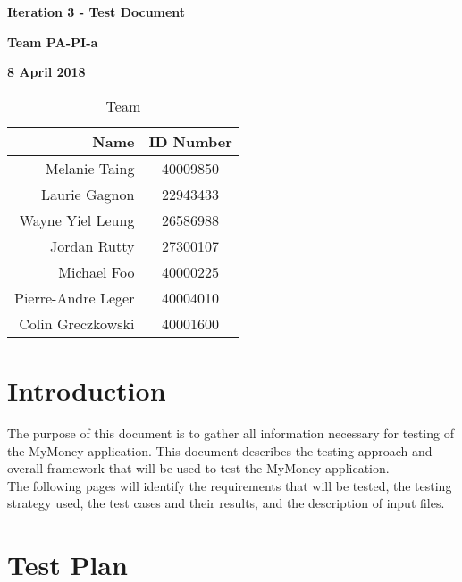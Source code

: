\documentclass[12pt]{article}
\begin{document}
\vspace*{0.5in}
\centerline{\bf\Large Iteration 3 - Test Document}

\vspace*{0.5in}
\centerline{\bf\Large Team PA-PI-a}

\vspace*{0.5in}
\centerline{\bf\Large 8 April 2018}

\vspace*{1.5in}
\begin{table}[htbp]
\caption{Team}
\begin{center}
\begin{tabular}{|r | c|}
\hline
Name & ID Number \\
\hline\hline
Melanie Taing & 40009850 \\
Laurie Gagnon & 22943433 \\
Wayne Yiel Leung & 26586988 \\
Jordan Rutty & 27300107 \\
Michael Foo & 40000225 \\
Pierre-Andre Leger & 40004010 \\
Colin Greczkowski & 40001600 \\
\hline
\end{tabular}
\end{center}
\end{table}

\clearpage

\pagestyle{plain}

\tableofcontents
\clearpage

\listoffigures
\newpage

\pagestyle{plain}

\section{Introduction}
The purpose of this document is to gather all information necessary for testing of the MyMoney application. This document describes the testing approach and overall framework that will be used to test the MyMoney application.\\

The following pages will identify the requirements that will be tested, the testing strategy used, the test cases and their results, and the description of input files.

\section{Test Plan}
\end{document}
